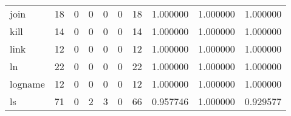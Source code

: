 \begin{longtable}{lrrrrrrrrr}
join      &                                      18 &                                                  0 &                                                  0 &                                                  0 &                                                  0 &                                                 18 &                                           1.000000 &                               1.000000 &                             1.000000 \\
kill      &                                      14 &                                                  0 &                                                  0 &                                                  0 &                                                  0 &                                                 14 &                                           1.000000 &                               1.000000 &                             1.000000 \\
link      &                                      12 &                                                  0 &                                                  0 &                                                  0 &                                                  0 &                                                 12 &                                           1.000000 &                               1.000000 &                             1.000000 \\
ln        &                                      22 &                                                  0 &                                                  0 &                                                  0 &                                                  0 &                                                 22 &                                           1.000000 &                               1.000000 &                             1.000000 \\
logname   &                                      12 &                                                  0 &                                                  0 &                                                  0 &                                                  0 &                                                 12 &                                           1.000000 &                               1.000000 &                             1.000000 \\
ls        &                                      71 &                                                  0 &                                                  2 &                                                  3 &                                                  0 &                                                 66 &                                           0.957746 &                               1.000000 &                             0.929577 \\

\end{longtable}
